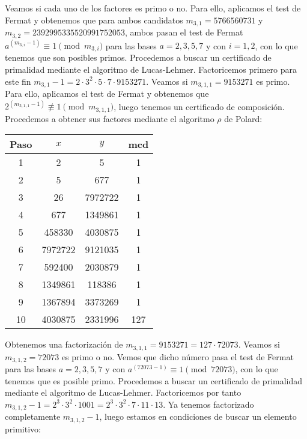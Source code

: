 \documentclass[fleqn]{article}
\begin{document}
    Veamos si cada uno de los factores es primo o no. Para ello, aplicamos el test de
    Fermat y obtenemos que para ambos candidatos $m_{3,1} = 5766560731$ y $m_{3,2} = 2392995335520991752053$, ambos pasan el test de Fermat $a^{(m_{3,i} - 1)} \equiv 1 \pmod{m_{3,i}}$
    para las bases $a = 2,3,5,7$ y con $i = 1,2$, con lo que tenemos que son posibles primos. Procedemos a buscar un certificado de primalidad mediante el algoritmo de Lucas-Lehmer.
    Factoricemos primero para este fin $m_{3,1} - 1 = 2 \cdot 3^2 \cdot 5 \cdot 7 \cdot 9153271$. Veamos si $m_{3,1,1} = 9153271$ es primo. Para ello, aplicamos el test de Fermat y
    obtenemos que $2^{(m_{3,1,1} - 1)} \not\equiv 1 \pmod{m_{3,1,1}}$, luego tenemos un certificado de composición. Procedemos a obtener sus factores mediante el algoritmo
    $\rho$ de Polard:
    \begin{center}
        \begin{tabular}{| c | c | c | c |}
            \hline Paso & $x$ & $y$ & mcd \\ \hline
            1 & 2 & 5 & 1 \\
            2 & 5 & 677 & 1 \\
            3 & 26 & 7972722 & 1 \\
            4 & 677 & 1349861 & 1 \\
            5 & 458330 & 4030875 & 1 \\
            6 & 7972722 & 9121035 & 1 \\
            7 & 592400 & 2030879 & 1 \\
            8 & 1349861 & 118386 & 1 \\
            9 & 1367894 & 3373269 & 1 \\
            10 & 4030875 & 2331996 & 127 \\ \hline
        \end{tabular}
    \end{center}
    Obtenemos una factorización de $m_{3,1,1} = 9153271 = 127 \cdot 72073$. Veamos si $m_{3,1,2} = 72073$ es primo o no. Vemos que dicho número pasa el test de Fermat para las bases 
    $a = 2,3,5,7$ y con $a^{(72073 - 1)} \equiv 1 \pmod{72073}$, con lo que tenemos que es posible primo. Procedemos a buscar un certificado de primalidad mediante el algoritmo
    de Lucas-Lehmer. Factoricemos por tanto $m_{3,1,2} - 1 = 2^3 \cdot 3^2 \cdot 1001 = 2^3 \cdot 3^2 \cdot 7 \cdot 11 \cdot 13 $. Ya tenemos factorizado completamente 
    $m_{3,1,2} - 1$, luego estamos en condiciones de buscar un elemento primitivo:
\end{document}
